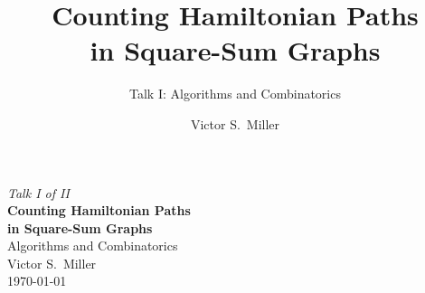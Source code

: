 \documentclass[aspectratio=169,t]{beamer}
\title{Counting Hamiltonian Paths\\in Square-Sum Graphs}
\subtitle{Talk I: Algorithms and Combinatorics}
\author{Victor S.\ Miller}
\date{}
\begin{document}
{
\begin{frame}[plain]
  \vspace{1.0cm}
  \begin{center}
    {\color{lightblue}\small\itshape Talk I of II}\\[0.5cm]
    {\color{white}\LARGE\bfseries Counting Hamiltonian Paths\\[4pt]
     in Square-Sum Graphs}\\[0.7cm]
    {\color{lightblue}\large Algorithms and Combinatorics}\\[0.9cm]
    {\color{white}\large Victor S.\ Miller}\\[0.3cm]
    {\color{lightblue!70}\normalsize \today}
  \end{center}
\end{frame}
}
\end{document}
